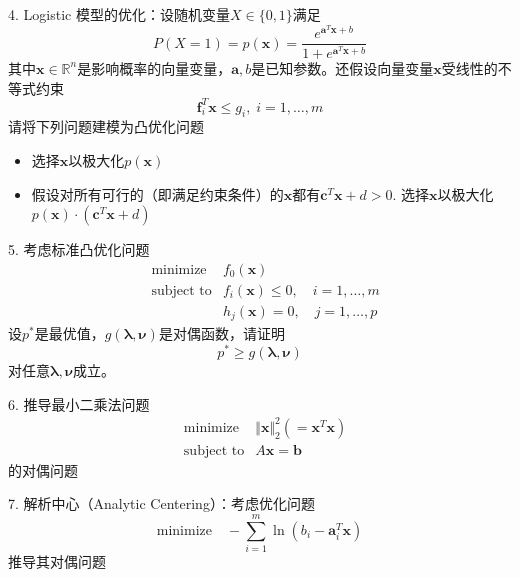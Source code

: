 
\begin{frame}

4. Logistic 模型的优化：设随机变量$X\in\{0,1\}$满足
\[P(X=1) = p(\mathbf{x}) = \dfrac{e^{\mathbf{a}^T\mathbf{x} + b}}{1 + e^{\mathbf{a}^T\mathbf{x} + b}}\]
其中$\mathbf{x} \in \mathbb{R}^n$是影响概率的向量变量，$\mathbf{a}, b$是已知参数。还假设向量变量$\mathbf{x}$受线性的不等式约束
\[\mathbf{f}_i^T\mathbf{x} \le g_i, \; i=1,\ldots,m\]
请将下列问题建模为凸优化问题
\begin{itemize}
\item[(1)] 选择$\mathbf{x}$以极大化$p(\mathbf{x})$
\item[(2)] 假设对所有可行的（即满足约束条件）的$\mathbf{x}$都有$\mathbf{c}^T\mathbf{x} + d > 0$. 选择$\mathbf{x}$以极大化$p(\mathbf{x})\cdot (\mathbf{c}^T\mathbf{x} + d)$
\end{itemize}

\end{frame}


\begin{frame}

5. 考虑标准凸优化问题
\begin{eqnarray*}
& \text{minimize} & f_0(\mathbf{x}) \\
& \text{subject to} & f_i(\mathbf{x}) \le 0, \quad i = 1,\ldots,m \\
& & h_j(\mathbf{x}) = 0, \quad j = 1,\ldots,p
\end{eqnarray*}
设$p^*$是最优值，$g(\boldsymbol\lambda, \boldsymbol\nu)$是对偶函数，请证明
\[p^* \ge g(\boldsymbol\lambda, \boldsymbol\nu)\]
对任意$\boldsymbol\lambda, \boldsymbol\nu$成立。

\end{frame}


\begin{frame}

6. 推导最小二乘法问题
\begin{eqnarray*}
& \text{minimize} & \Vert \mathbf{x} \Vert_2^2 (= \mathbf{x}^T\mathbf{x}) \\
& \text{subject to} & A\mathbf{x} = \mathbf{b}
\end{eqnarray*}
的对偶问题

\vspace{1em}

7. 解析中心（Analytic Centering）：考虑优化问题
\[\text{minimize} \quad -\sum\limits_{i=1}^m \ln(b_i - \mathbf{a}_i^T\mathbf{x})\]
推导其对偶问题

\end{frame}

